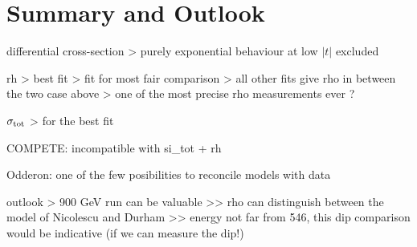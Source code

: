 \section{Summary and Outlook}
\label{sec:summary}

\bgroup
\parskip0pt

\> differential cross-section
\>> purely exponential behaviour at low $|t|$ excluded

\> rh
\>> best fit
\>> fit for most fair comparison
\>> all other fits give rho in between the two case above
\>> one of the most precise rho measurements ever ?

\> $\sigma_{\rm tot}$
\>> for the best fit

\> COMPETE: incompatible with si\_tot + rh

\> Odderon: one of the few posibilities to reconcile models with data



\> outlook
\>> 900 GeV run can be valuable
\>>> rho can distinguish between the model of Nicolescu and Durham
\>>> energy not far from 546, this dip comparison would be indicative (if we can measure the dip!)

\egroup
